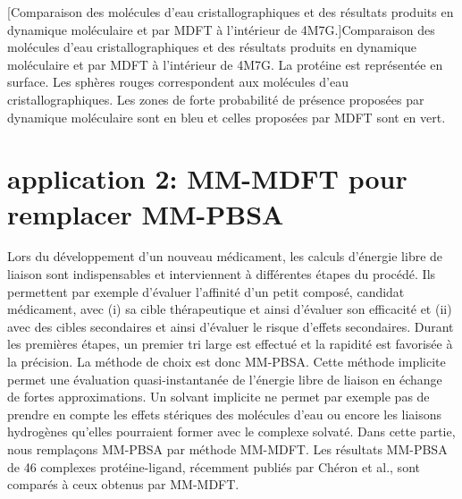 \begin{center}
    \captionsetup{type=figure}
	[Comparaison des molécules d'eau cristallographiques et des résultats produits en dynamique moléculaire et par MDFT à l'intérieur de 4M7G.]{Comparaison des molécules d'eau cristallographiques et des résultats produits en dynamique moléculaire et par MDFT à l'intérieur de 4M7G. La protéine est représentée en surface. Les sphères rouges correspondent aux molécules d'eau cristallographiques. Les zones de forte probabilité de présence proposées par dynamique moléculaire sont en bleu et celles proposées par MDFT sont en vert.}
      \label{fig:interieur_water_molecule}
\end{center}




\clearpage
\section{application 2: MM-MDFT pour remplacer MM-PBSA}
Lors du développement d'un nouveau médicament, les calculs d'énergie libre de liaison sont indispensables et interviennent à différentes étapes du procédé. Ils permettent par exemple d'évaluer l'affinité d'un petit composé, candidat médicament, avec (i) sa cible thérapeutique et ainsi d'évaluer son efficacité et (ii) avec des cibles secondaires et ainsi d'évaluer le risque d'effets secondaires. Durant les premières étapes, un premier tri large est effectué et la rapidité est favorisée à la précision. La méthode de choix est donc MM-PBSA\cite{genheden_mm/pbsa_2015}. Cette méthode implicite permet une évaluation quasi-instantanée de l'énergie libre de liaison en échange de fortes approximations. Un solvant implicite ne permet par exemple pas de prendre en compte les effets stériques des molécules d'eau ou encore les liaisons hydrogènes qu'elles pourraient former avec le complexe solvaté. Dans cette partie, nous remplaçons MM-PBSA par méthode MM-MDFT. Les résultats MM-PBSA de 46 complexes protéine-ligand, récemment publiés par Chéron et al.\cite{cheron_effect_2017}, sont comparés à ceux obtenus par MM-MDFT.

